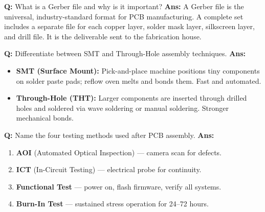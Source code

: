 \documentclass[10pt,a4paper,twocolumn]{article}
\begin{document}
\begin{tcolorbox}[
  colback=white,
  colframe=UnitColorNine,
  colbacktitle=gray!10!white,
  coltitle=black,
  fonttitle=\bfseries\sffamily\small,
  title={Unit IX $\bullet$ Card 2},
  boxrule=1.2pt,
  arc=2mm,
  outer arc=2mm,
  boxsep=1.5mm,
  top=1mm,
  bottom=1mm,
  left=1.5mm,
  right=1.5mm,
  before skip=2.5mm,
  after skip=2.5mm
]
\textbf{Q:} What is a Gerber file and why is it important?
\tcbline
\textbf{Ans:} A Gerber file is the universal, industry-standard format for PCB manufacturing. A complete set includes a separate file for each copper layer, solder mask layer, silkscreen layer, and drill file. It is the deliverable sent to the fabrication house.
\end{tcolorbox}


\begin{tcolorbox}[
  colback=white,
  colframe=UnitColorNine,
  colbacktitle=gray!10!white,
  coltitle=black,
  fonttitle=\bfseries\sffamily\small,
  title={Unit IX $\bullet$ Card 3},
  boxrule=1.2pt,
  arc=2mm,
  outer arc=2mm,
  boxsep=1.5mm,
  top=1mm,
  bottom=1mm,
  left=1.5mm,
  right=1.5mm,
  before skip=2.5mm,
  after skip=2.5mm
]
\textbf{Q:} Differentiate between SMT and Through-Hole assembly techniques.
\tcbline
\textbf{Ans:} \begin{itemize}
  \item \textbf{SMT (Surface Mount):} Pick-and-place machine positions tiny components on solder paste pads; reflow oven melts and bonds them. Fast and automated.
  \item \textbf{Through-Hole (THT):} Larger components are inserted through drilled holes and soldered via wave soldering or manual soldering. Stronger mechanical bonds.
\end{itemize}
\end{tcolorbox}


\begin{tcolorbox}[
  colback=white,
  colframe=UnitColorNine,
  colbacktitle=gray!10!white,
  coltitle=black,
  fonttitle=\bfseries\sffamily\small,
  title={Unit IX $\bullet$ Card 4},
  boxrule=1.2pt,
  arc=2mm,
  outer arc=2mm,
  boxsep=1.5mm,
  top=1mm,
  bottom=1mm,
  left=1.5mm,
  right=1.5mm,
  before skip=2.5mm,
  after skip=2.5mm
]
\textbf{Q:} Name the four testing methods used after PCB assembly.
\tcbline
\textbf{Ans:} \begin{enumerate}
  \item \textbf{AOI} (Automated Optical Inspection) — camera scan for defects.
  \item \textbf{ICT} (In-Circuit Testing) — electrical probe for continuity.
  \item \textbf{Functional Test} — power on, flash firmware, verify all systems.
  \item \textbf{Burn-In Test} — sustained stress operation for 24–72 hours.
\end{enumerate}
\end{tcolorbox}
\end{document}
